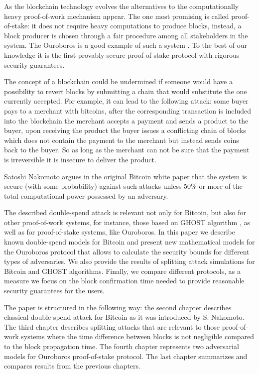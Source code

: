 \documentclass[10pt,a4paper]{article}
\numberwithin{equation}{section} %
\theoremstyle{plain}
\theoremstyle{definition}
\theoremstyle{remark}
\begin{document}
	As the blockchain technology evolves the alternatives to the computationally heavy proof-of-work mechanism appear. The one most promising is called proof-of-stake: it does not require heavy computations to produce blocks, instead, a block producer is chosen through a fair procedure among all stakeholders in the system. The Ouroboros is a good example of such a system \cite{KRDO16}. To the best of our knowledge it is the first provably secure proof-of-stake protocol with rigorous security guarantees.
	
	The concept of a blockchain could be undermined if someone would have a possibility to revert blocks by submitting a chain that would substitute the one currently accepted. For example, it can lead to the following attack: some buyer pays to a merchant with bitcoins, after the corresponding transaction is included into the blockchain the merchant accepts a payment and sends a product to the buyer, upon receiving the product the buyer issues a conflicting chain of blocks which does not contain the payment to the merchant but instead sends coins back to the buyer. So as long as the merchant can not be sure that the payment is irreversible it is insecure to deliver the product.
	
	Satoshi Nakomoto argues in the original Bitcoin white paper \cite{N08} that the system is secure (with some probability) against such attacks unless 50\% or more of the total computational power possessed by an adversary.
	
	The described double-spend attack is relevant not only for Bitcoin, but also for other proof-of-work systems, for instance, those based on GHOST algorithm \cite{ZS13}, as well as for proof-of-stake systems, like Ouroboros. In this paper we describe known double-spend models for Bitcoin and present new mathematical models for the Ouroboros protocol that allows to calculate the security bounds for different types of adversaries. We also provide the results of splitting attack simulations for Bitcoin and GHOST algorithms. Finally, we compare different protocols, as a measure we focus on the block confirmation time needed to provide reasonable security guarantees for the users. 
	
	The paper is structured in the following way: the second chapter describes classical double-spend attack for Bitcoin as it was introduced by S. Nakomoto. The third chapter describes splitting attacks that are relevant to those proof-of-work systems where the time difference between blocks is not negligible compared to the block propagation time. The fourth chapter represents two adversarial models for Ouroboros proof-of-stake protocol. The last chapter summarizes and compares results from the previous chapters. 
	 
\end{document}
